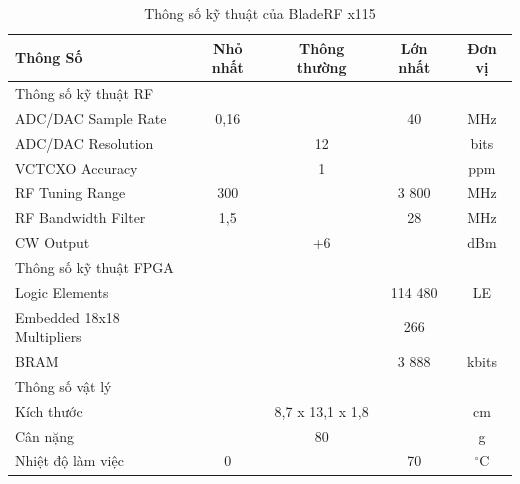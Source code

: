 \begin{table}[!htb]
\caption{Thông số kỹ thuật của BladeRF x115}
\resizebox{1\hsize}{!} {
\begin{tabular}{|l|c|c|c|c|} 
\hline
\rowcolor[rgb]{1,0.925,0.918} Thông Số & Nhỏ nhất & Thông thường     & Lớn nhất & Đơn vị        \\ 
\hline
\multicolumn{5}{|l|}{{\cellcolor[rgb]{0.937,0.937,0.937}}Thông số kỹ thuật RF}                  \\ 
\hline
ADC/DAC Sample Rate                    & 0,16     &                  & 40       & MHz           \\ 
\hline
ADC/DAC Resolution                     &          & 12               &          & bits          \\ 
\hline
VCTCXO Accuracy                        &          & 1                &          & ppm           \\ 
\hline
RF Tuning Range                        & 300      &                  & 3 800    & MHz           \\ 
\hline
RF Bandwidth Filter                    & 1,5      &                  & 28       & MHz           \\ 
\hline
CW Output                              &          & +6               &          & dBm           \\ 
\hline
\multicolumn{5}{|l|}{{\cellcolor[rgb]{0.937,0.937,0.937}}Thông số kỹ thuật FPGA}                \\ 
\hline
Logic Elements                         &          &                  & 114 480  & LE            \\ 
\hline
Embedded 18x18 Multipliers             &          &                  & 266      &               \\ 
\hline
BRAM                                   &          &                  & 3 888    & kbits         \\ 
\hline
\multicolumn{5}{|l|}{{\cellcolor[rgb]{0.937,0.937,0.937}}Thông số vật lý}                       \\ 
\hline
Kích thước                             &          & 8,7 x 13,1 x 1,8 &          & cm            \\ 
\hline
Cân nặng                               &          & 80               &          & g             \\ 
\hline
Nhiệt độ làm việc                      & 0        &                  & 70       & $^{\circ}$C   \\
\hline
\end{tabular}
}
\label{parabladeRF}
\end{table}

